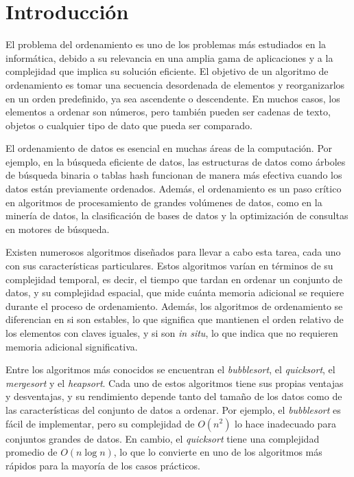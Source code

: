 \section{Introducción}
El problema del ordenamiento es uno de los problemas más estudiados en la informática, debido a su relevancia en una amplia gama de aplicaciones y a la complejidad que implica su solución eficiente. El objetivo de un algoritmo de ordenamiento es tomar una secuencia desordenada de elementos y reorganizarlos en un orden predefinido, ya sea ascendente o descendente. En muchos casos, los elementos a ordenar son números, pero también pueden ser cadenas de texto, objetos o cualquier tipo de dato que pueda ser comparado.

El ordenamiento de datos es esencial en muchas áreas de la computación. Por ejemplo, en la búsqueda eficiente de datos, las estructuras de datos como árboles de búsqueda binaria o tablas hash funcionan de manera más efectiva cuando los datos están previamente ordenados. Además, el ordenamiento es un paso crítico en algoritmos de procesamiento de grandes volúmenes de datos, como en la minería de datos, la clasificación de bases de datos y la optimización de consultas en motores de búsqueda.

Existen numerosos algoritmos diseñados para llevar a cabo esta tarea, cada uno con sus características particulares. Estos algoritmos varían en términos de su complejidad temporal, es decir, el tiempo que tardan en ordenar un conjunto de datos, y su complejidad espacial, que mide cuánta memoria adicional se requiere durante el proceso de ordenamiento. Además, los algoritmos de ordenamiento se diferencian en si son estables, lo que significa que mantienen el orden relativo de los elementos con claves iguales, y si son \textit{in situ}, lo que indica que no requieren memoria adicional significativa.

Entre los algoritmos más conocidos se encuentran el \textit{bubblesort}, el \textit{quicksort}, el \textit{mergesort} y el \textit{heapsort}. Cada uno de estos algoritmos tiene sus propias ventajas y desventajas, y su rendimiento depende tanto del tamaño de los datos como de las características del conjunto de datos a ordenar. Por ejemplo, el \textit{bubblesort} es fácil de implementar, pero su complejidad de \(O(n^2)\) lo hace inadecuado para conjuntos grandes de datos. En cambio, el \textit{quicksort} tiene una complejidad promedio de \(O(n \log n)\), lo que lo convierte en uno de los algoritmos más rápidos para la mayoría de los casos prácticos.

